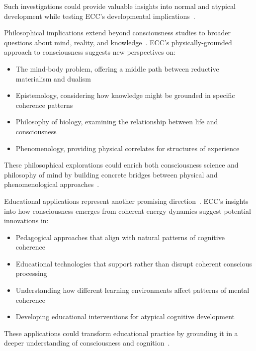 Such investigations could provide valuable insights into normal and atypical development while testing ECC's developmental implications~\cite{thompson2014waking, bosl2025dynamical}.

Philosophical implications extend beyond consciousness studies to broader questions about mind, reality, and knowledge~\cite{goff2019galileo, thompson2010mind}. ECC's physically-grounded approach to consciousness suggests new perspectives on:

\begin{itemize}
    \item The mind-body problem, offering a middle path between reductive materialism and dualism
    \item Epistemology, considering how knowledge might be grounded in specific coherence patterns
    \item Philosophy of biology, examining the relationship between life and consciousness
    \item Phenomenology, providing physical correlates for structures of experience
\end{itemize}

These philosophical explorations could enrich both consciousness science and philosophy of mind by building concrete bridges between physical and phenomenological approaches~\cite{thompson2014waking, zahavi2014self}.

Educational applications represent another promising direction~\cite{noe2009out, gibson2015ecological}. ECC's insights into how consciousness emerges from coherent energy dynamics suggest potential innovations in:

\begin{itemize}
    \item Pedagogical approaches that align with natural patterns of cognitive coherence
    \item Educational technologies that support rather than disrupt coherent conscious processing
    \item Understanding how different learning environments affect patterns of mental coherence
    \item Developing educational interventions for atypical cognitive development
\end{itemize}

These applications could transform educational practice by grounding it in a deeper understanding of consciousness and cognition~\cite{thompson2014waking, bateson2002mind}.


